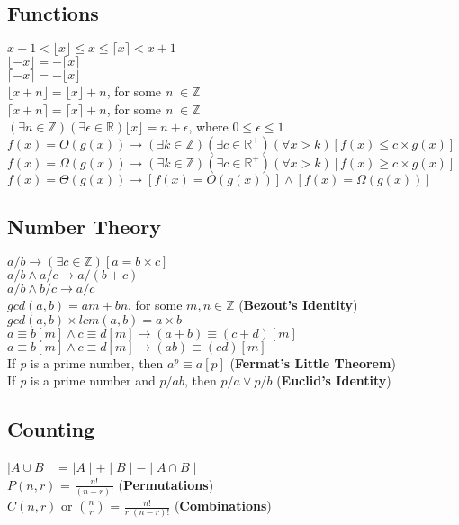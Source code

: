 \subsection{Functions}
\indent \indent $ x - 1 < \lfloor x \rfloor \leq x \leq \lceil x \rceil < x +
1$ \\
\indent $ \lfloor - x \rfloor = - \lceil x \rceil$ \\
\indent $ \lceil -x \rceil = - \lfloor x \rfloor$ \\
\indent $ \lfloor x + n \rfloor = \lfloor x \rfloor + n$, for some \emph{n}
$\in \mathbb{Z}$ \\
\indent $ \lceil x + n \rceil = \lceil x \rceil + n$, for some \emph{n} $\in
\mathbb{Z}$ \\
\indent $(\exists n \in \mathbb{Z})(\exists \epsilon \in \mathbb{R}) \lfloor x
\rfloor = n + \epsilon$, where $ 0 \leq \epsilon \leq 1$ \\
\indent $f(x) = O(g(x)) \rightarrow (\exists k \in \mathbb{Z})(\exists c \in
\mathbb{R^{+}})(\forall x > k)[f(x) \leq c \times g(x)]$\\
\indent $f(x) = \Omega(g(x)) \rightarrow (\exists k \in \mathbb{Z})(\exists c
\in \mathbb{R^{+}})(\forall x > k)[f(x) \geq c \times g(x)]$\\
\indent $f(x) = \Theta(g(x)) \rightarrow [f(x) = O(g(x))] \wedge [f(x) =
\Omega(g(x))]$

\subsection{Number Theory}
\indent \indent $ a / b \rightarrow (\exists c \in \mathbb{Z})[a = b \times
c]$\\
\indent $ a / b \wedge a / c \rightarrow a / (b + c)$\\
\indent $ a/ b \wedge b / c \rightarrow a / c $\\
\indent $ gcd(a, b) = am + bn$, for some $m, n \in \mathbb{Z}$
(\textbf{Bezout's Identity})\\
\indent $ gcd(a, b) \times lcm(a, b) = a \times b$\\
\indent $ a \equiv b[m] \wedge c \equiv d[m] \rightarrow (a + b) \equiv (c +
d)[m]$\\
\indent $ a \equiv b[m] \wedge c \equiv d[m] \rightarrow (ab) \equiv (cd)[m]$\\
\indent If \emph{p} is a prime number, then $a^{p} \equiv a[p]$
(\textbf{Fermat's Little Theorem})\\
\indent If \emph{p} is a prime number and $p / ab$, then $p / a \vee p / b$
(\textbf{Euclid's Identity})\\

\subsection{Counting}
\indent \indent $\mid A \cup B \mid$ =  $\mid A \mid + \mid B \mid - \mid A
\cap B \mid$ \\
\indent $P(n,r)$ = $ \frac{n!}{(n - r)!}$ (\textbf{Permutations}) \\
\indent $C(n,r)$ or $\binom{n}{r}$ = $\frac{n!}{r!(n - r)!}$
(\textbf{Combinations})
